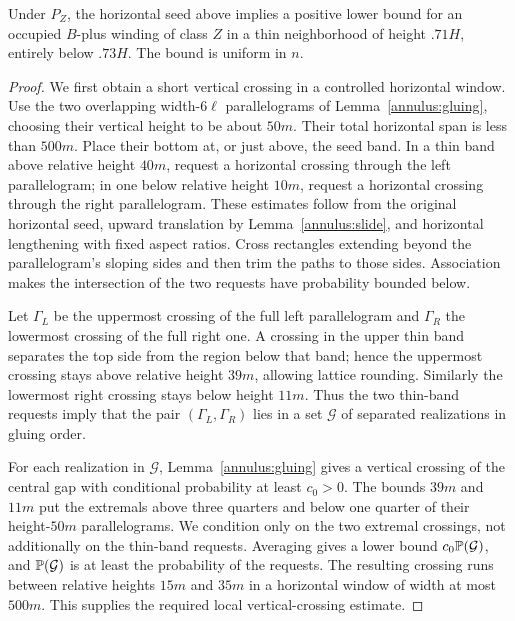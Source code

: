 \begin{lemma}\label{annulus:winding}
Under $P_Z$, the horizontal seed above implies a positive lower bound
for an occupied $B$-plus winding of class $Z$ in a thin neighborhood of
height $.71H$, entirely below $.73H$.  The bound is uniform in $n$.
\end{lemma}
\begin{proof}
We first obtain a short vertical crossing in a controlled horizontal
window.  Use the two overlapping width-$6\ell$ parallelograms of
Lemma~\ref{annulus:gluing}, choosing their vertical height to be about
$50m$.  Their total horizontal span is less than $500m$.  Place their bottom at, or just
above, the seed band.  In a thin band above relative height $40m$,
request a horizontal crossing through the left parallelogram; in one
below relative height $10m$, request a horizontal crossing through the
right parallelogram.  These estimates follow from the original
horizontal seed, upward translation by Lemma~\ref{annulus:slide}, and
horizontal lengthening with fixed aspect ratios.  Cross rectangles
extending beyond the parallelogram's sloping sides and then trim the
paths to those sides.  Association makes the intersection of the two
requests have probability bounded below.

Let $\Gamma_L$ be the uppermost crossing of the full left
parallelogram and $\Gamma_R$ the lowermost crossing of the full right
one.  A crossing in the upper thin band separates the top side from the
region below that band; hence the uppermost crossing stays above
relative height $39m$, allowing lattice rounding.  Similarly the
lowermost right crossing stays below height $11m$.  Thus the two
thin-band requests imply that the pair $(\Gamma_L,\Gamma_R)$ lies in
a set $\mathcal G$ of separated realizations in gluing order.

For each realization in $\mathcal G$,
Lemma~\ref{annulus:gluing} gives a vertical crossing of the central gap
with conditional probability at least $c_0>0$.  The bounds $39m$ and
$11m$ put the extremals above three quarters and below one quarter of
their height-$50m$ parallelograms.  We condition only on the two
extremal crossings, not additionally on the thin-band requests.
Averaging gives a lower bound $c_0\mathbb P(\mathcal G)$, and
$\mathbb P(\mathcal G)$ is at least the probability of the requests.
The resulting crossing runs between relative heights $15m$ and $35m$
in a horizontal window of width at most $500m$.  This supplies the
required local vertical-crossing estimate.


\end{proof}

